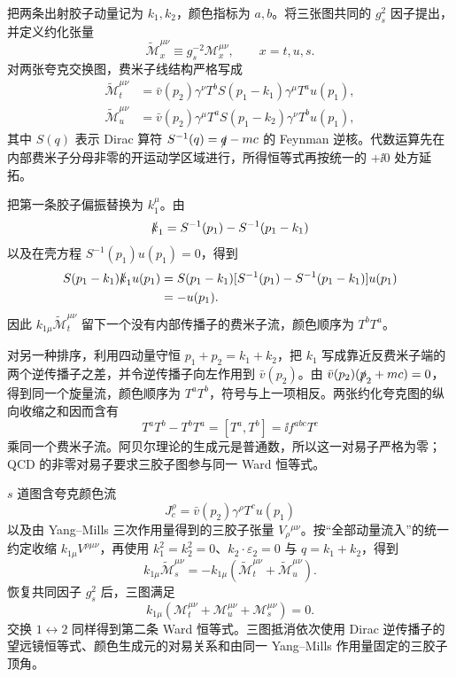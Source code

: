 \begin{derivation}
把两条出射胶子动量记为 $k_1,k_2$，颜色指标为 $a,b$。将三张图共同的 $g_s^2$ 因子提出，并定义约化张量
\begin{equation*}
 \widetilde{\mathcal M}_x^{\mu\nu}
 \equiv g_s^{-2}\mathcal M_x^{\mu\nu},
 \qquad x=t,u,s.
\end{equation*}
对两张夸克交换图，费米子线结构严格写成
\begin{align*}
 \widetilde{\mathcal M}_t^{\mu\nu}
 &=\bar v(p_2)\gamma^\nu T^b
 S(p_1-k_1)\gamma^\mu T^a u(p_1),\\
 \widetilde{\mathcal M}_u^{\mu\nu}
 &=\bar v(p_2)\gamma^\mu T^a
 S(p_1-k_2)\gamma^\nu T^b u(p_1),
\end{align*}
其中 $S(q)$ 表示 Dirac 算符 $S^{-1}(q)=\slashed q-mc$ 的 Feynman 逆核。代数运算先在内部费米子分母非零的开运动学区域进行，所得恒等式再按统一的 $+\ii0$ 处方延拓。

把第一条胶子偏振替换为 $k_1^\mu$。由
\begin{equation*}
 \slashed k_1
 =S^{-1}(p_1)-S^{-1}(p_1-k_1)
\end{equation*}
以及在壳方程 $S^{-1}(p_1)u(p_1)=0$，得到
\begin{align*}
 S(p_1-k_1)\slashed k_1u(p_1)
 &=S(p_1-k_1)
 [S^{-1}(p_1)-S^{-1}(p_1-k_1)]u(p_1)\\
 &=-u(p_1).
\end{align*}
因此 $k_{1\mu}\widetilde{\mathcal M}_t^{\mu\nu}$ 留下一个没有内部传播子的费米子流，颜色顺序为 $T^bT^a$。

对另一种排序，利用四动量守恒 $p_1+p_2=k_1+k_2$，把 $k_1$ 写成靠近反费米子端的两个逆传播子之差，并令逆传播子向左作用到 $\bar v(p_2)$。由 $\bar v(p_2)(\slashed p_2+mc)=0$，得到同一个旋量流，颜色顺序为 $T^aT^b$，符号与上一项相反。两张约化夸克图的纵向收缩之和因而含有
\begin{equation*}
 T^aT^b-T^bT^a=[T^a,T^b]=\ii f^{abc}T^c
\end{equation*}
乘同一个费米子流。阿贝尔理论的生成元是普通数，所以这一对易子严格为零；QCD 的非零对易子要求三胶子图参与同一 Ward 恒等式。

$s$ 道图含夸克颜色流
\begin{equation*}
 J_c^\rho=\bar v(p_2)\gamma^\rho T^c u(p_1)
\end{equation*}
以及由 Yang--Mills 三次作用量得到的三胶子张量 $V_{\rho}{}^{\mu\nu}$。按“全部动量流入”的统一约定收缩 $k_{1\mu}V^{\rho\mu\nu}$，再使用 $k_1^2=k_2^2=0$、$k_2\cdot\varepsilon_2=0$ 与 $q=k_1+k_2$，得到
\begin{equation*}
 k_{1\mu}\widetilde{\mathcal M}_s^{\mu\nu}
 =-k_{1\mu}
 \left(\widetilde{\mathcal M}_t^{\mu\nu}
 +\widetilde{\mathcal M}_u^{\mu\nu}\right).
\end{equation*}
恢复共同因子 $g_s^2$ 后，三图满足
\begin{equation*}
 k_{1\mu}
 \left(\mathcal M_t^{\mu\nu}
 +\mathcal M_u^{\mu\nu}
 +\mathcal M_s^{\mu\nu}\right)=0.
\end{equation*}
交换 $1\leftrightarrow2$ 同样得到第二条 Ward 恒等式。三图抵消依次使用 Dirac 逆传播子的望远镜恒等式、颜色生成元的对易关系和由同一 Yang--Mills 作用量固定的三胶子顶角。
\end{derivation}

